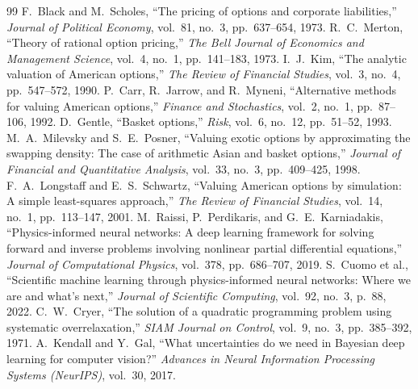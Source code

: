 \documentclass[11pt,a4paper,oneside]{book}
\begin{document}
\begin{thebibliography}{99}
 F.~Black and M.~Scholes, ``The pricing of options and corporate liabilities,'' \emph{Journal of Political Economy}, vol.~81, no.~3, pp.~637--654, 1973.
 R.~C.~Merton, ``Theory of rational option pricing,'' \emph{The Bell Journal of Economics and Management Science}, vol.~4, no.~1, pp.~141--183, 1973.
 I.~J.~Kim, ``The analytic valuation of American options,'' \emph{The Review of Financial Studies}, vol.~3, no.~4, pp.~547--572, 1990.
 P.~Carr, R.~Jarrow, and R.~Myneni, ``Alternative methods for valuing American options,'' \emph{Finance and Stochastics}, vol.~2, no.~1, pp.~87--106, 1992.
 D.~Gentle, ``Basket options,'' \emph{Risk}, vol.~6, no.~12, pp.~51--52, 1993.
 M.~A.~Milevsky and S.~E.~Posner, ``Valuing exotic options by approximating the swapping density: The case of arithmetic Asian and basket options,'' \emph{Journal of Financial and Quantitative Analysis}, vol.~33, no.~3, pp.~409--425, 1998.
 F.~A.~Longstaff and E.~S.~Schwartz, ``Valuing American options by simulation: A simple least-squares approach,'' \emph{The Review of Financial Studies}, vol.~14, no.~1, pp.~113--147, 2001.
 M.~Raissi, P.~Perdikaris, and G.~E.~Karniadakis, ``Physics-informed neural networks: A deep learning framework for solving forward and inverse problems involving nonlinear partial differential equations,'' \emph{Journal of Computational Physics}, vol.~378, pp.~686--707, 2019.
 S.~Cuomo et al., ``Scientific machine learning through physics-informed neural networks: Where we are and what's next,'' \emph{Journal of Scientific Computing}, vol.~92, no.~3, p.~88, 2022.
 C.~W.~Cryer, ``The solution of a quadratic programming problem using systematic overrelaxation,'' \emph{SIAM Journal on Control}, vol.~9, no.~3, pp.~385--392, 1971.
 A.~Kendall and Y.~Gal, ``What uncertainties do we need in Bayesian deep learning for computer vision?'' \emph{Advances in Neural Information Processing Systems (NeurIPS)}, vol.~30, 2017.
\end{thebibliography}
\end{document}
